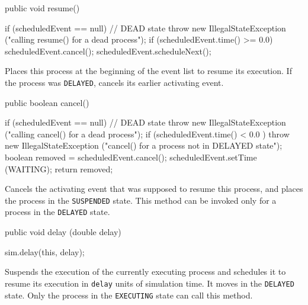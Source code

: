\begin{htmlonly}
\end{htmlonly}
\begin{code}

   public void resume() \begin{hide} {
      if (scheduledEvent == null)   // DEAD state
         throw new IllegalStateException ("calling resume() for a dead process");
      if (scheduledEvent.time() >= 0.0)  scheduledEvent.cancel();
      scheduledEvent.scheduleNext();
   } \end{hide}
\end{code}
  \begin{tabb} Places this process at the beginning of the event list
   to resume its execution.  If the process was \texttt{DELAYED}, cancels
   its earlier activating event.
  \end{tabb}
\begin{code}

   public boolean cancel() \begin{hide} {
      if (scheduledEvent == null) // DEAD state
         throw new IllegalStateException ("calling cancel() for a dead process");
      if (scheduledEvent.time() < 0.0 )
         throw new IllegalStateException
                   ("cancel() for a process not in DELAYED state");
      boolean removed = scheduledEvent.cancel();
      scheduledEvent.setTime (WAITING);
      return removed;
   } \end{hide}
\end{code}
  \begin{tabb}  Cancels the activating event that was supposed to resume
   this process, and places the process in the \texttt{SUSPENDED} state.
   This method can be invoked only for a process in the \texttt{DELAYED}
   state.
  \end{tabb}
\begin{htmlonly}
\end{htmlonly}
\begin{code}

   public void delay (double delay) \begin{hide} {
      sim.delay(this, delay);
   } \end{hide}
\end{code}
  \begin{tabb}  Suspends the execution of the currently executing process and
    schedules it to resume its execution in \texttt{delay} units of simulation
    time.  It moves in the \texttt{DELAYED} state.
    Only the process in the \texttt{EXECUTING} state can call this method.
  \end{tabb}
